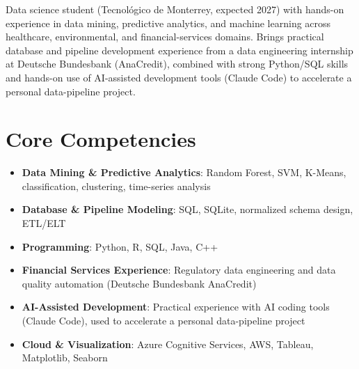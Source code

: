 \documentclass[11pt,a4paper,sans]{moderncv}
\begin{document}
\makecvtitle


\vspace{6pt}
\small{Data science student (Tecnológico de Monterrey, expected 2027) with hands-on experience in data mining, predictive analytics, and machine learning across healthcare, environmental, and financial-services domains. Brings practical database and pipeline development experience from a data engineering internship at Deutsche Bundesbank (AnaCredit), combined with strong Python/SQL skills and hands-on use of AI-assisted development tools (Claude Code) to accelerate a personal data-pipeline project.}


\section{Core Competencies}
\vspace{1pt}
\begin{itemize}

\item \textbf{Data Mining \& Predictive Analytics}: Random Forest, SVM, K-Means, classification, clustering, time-series analysis

\item \textbf{Database \& Pipeline Modeling}: SQL, SQLite, normalized schema design, ETL/ELT

\item \textbf{Programming}: Python, R, SQL, Java, C++

\item \textbf{Financial Services Experience}: Regulatory data engineering and data quality automation (Deutsche Bundesbank AnaCredit)

\item \textbf{AI-Assisted Development}: Practical experience with AI coding tools (Claude Code), used to accelerate a personal data-pipeline project

\item \textbf{Cloud \& Visualization}: Azure Cognitive Services, AWS, Tableau, Matplotlib, Seaborn

\end{itemize}
\end{document}

